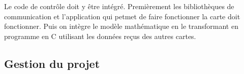 Le code de contrôle doit y être intégré. Premièrement les bibliothèques de communication et l'application qui petmet de faire fonctionner la carte doit fonctionner. Puis on intègre le modèle mathématique en le transformant en programme en C utilisant les données reçus des autres cartes.

\subsection{Gestion du projet} %
\label{sub:Gestion du projet}



